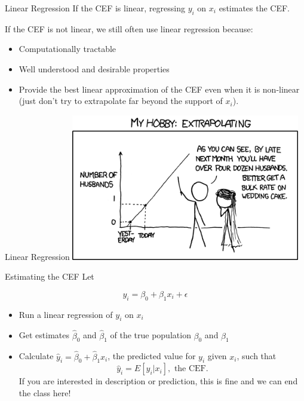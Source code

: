 \documentclass[
  ignorenonframetext,
]{beamer}
\providecommand{\tightlist}{%
  \setlength{\itemsep}{0pt}\setlength{\parskip}{0pt}}
\begin{document}
\begin{frame}{Linear Regression}
\protect\hypertarget{linear-regression}{}
If the CEF is linear, regressing \(y_i\) on \(x_i\) estimates the CEF.

If the CEF is not linear, we still often use linear regression because:

\begin{itemize}
\tightlist
\item
  Computationally tractable
\item
  Well understood and desirable properties
\item
  Provide the best linear approximation of the CEF even when it is
  non-linear (just don't try to extrapolate far beyond the support of
  \(x_i\)).
\end{itemize}
\end{frame}

\begin{frame}{Linear Regression}
\protect\hypertarget{linear-regression-1}{}
\center \includegraphics[width=0.75\textwidth,height=\textheight]{"images/linearprojectioncomic.png"}
\end{frame}

\begin{frame}{Estimating the CEF}
\protect\hypertarget{estimating-the-cef}{}
Let

\[
y_i=\beta_0+\beta_1x_i+\epsilon
\]

\begin{itemize}
\item
  Run a linear regression of \(y_i\) on \(x_i\)
\item
  Get estimates \(\hat{\beta}_0\) and \(\hat{\beta}_1\) of the true
  population \(\beta_0\) and \(\beta_1\)
\item
  Calculate \(\hat{y}_i=\hat{\beta}_0+\hat{\beta}_1x_i\), the predicted
  value for \(y_i\) given \(x_i\), such that \[
  \hat{y}_i=E[y_i|x_i], \text{ the CEF.}
  \] If you are interested in description or prediction, this is fine
  and we can end the class here!
\end{itemize}
\end{frame}
\end{document}
